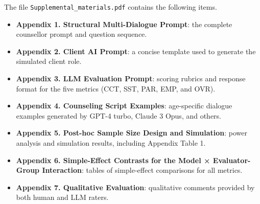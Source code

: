 \documentclass{wiley-article}
\begin{document}
The file \texttt{Supplemental\_materials.pdf} contains the following items.

\begin{itemize}
  \item \textbf{Appendix 1. Structural Multi-Dialogue Prompt}: the complete counsellor prompt and question sequence.
  \item \textbf{Appendix 2. Client AI Prompt}: a concise template used to generate the simulated client role.
  \item \textbf{Appendix 3. LLM Evaluation Prompt}: scoring rubrics and response format for the five metrics (CCT, SST, PAR, EMP, and OVR).
  \item \textbf{Appendix 4. Counseling Script Examples}: age-specific dialogue examples generated by GPT-4 turbo, Claude 3 Opus, and others.
  \item \textbf{Appendix 5. Post-hoc Sample Size Design and Simulation}: power analysis and simulation results, including Appendix Table 1.
  \item \textbf{Appendix 6. Simple-Effect Contrasts for the Model × Evaluator-Group Interaction}: tables of simple-effect comparisons for all metrics.
  \item \textbf{Appendix 7. Qualitative Evaluation}: qualitative comments provided by both human and LLM raters.
\end{itemize}




% 
% 



\clearpage                
% 
\end{document}
